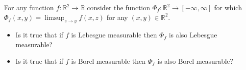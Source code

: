 For any function $f: \mathbb{R}^2\to \mathbb{R}$ consider the function $\Phi_f:\mathbb{R}^2\to [-\infty,\infty]$ for which $\Phi_f(x,y)=\limsup_{ z \to y} f(x,z)$ for any $(x,y) \in \mathbb{R}^2$.
\begin{itemize}
	\item Is it true that if $f$ is Lebesgue measurable then $\Phi_f$ is also Lebesgue measurable?
	\item Is it true that if $f$ is Borel measurable then $\Phi_f$ is also Borel measurable?
\end{itemize}
